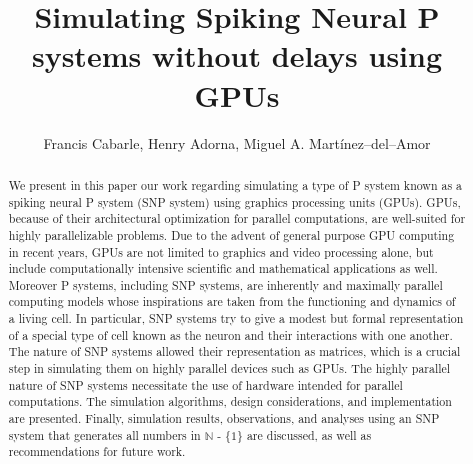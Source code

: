 \documentclass{svmultm}
\begin{document}
\title*{Simulating Spiking Neural P systems without delays using GPUs } \author{Francis Cabarle, Henry Adorna, Miguel A. Mart\'inez--del--Amor}
\date{}

\maketitle

 
\begin{abstract}


We present in this paper our work regarding simulating a type of P system known as a spiking neural P system (SNP system) using graphics processing units (GPUs). GPUs, because of their architectural optimization for parallel computations, are well-suited for highly parallelizable problems. Due to the advent of general purpose GPU computing in recent years, GPUs are not limited to graphics and video processing alone, but include computationally intensive scientific and mathematical applications as well. Moreover P systems, including SNP systems, are inherently and maximally parallel computing models whose inspirations are taken from the functioning and dynamics of a living cell. In particular, SNP systems try to give a modest but formal representation of a special type of cell known as the neuron and their interactions with one another. The nature of SNP systems allowed their representation as matrices, which is a crucial step in simulating them on highly parallel devices such as GPUs. The highly parallel nature of SNP systems necessitate the use of hardware intended for parallel computations. The simulation algorithms, design considerations, and implementation are presented. Finally, simulation results, observations, and analyses using an SNP system that generates all numbers in $\mathbb N$ - \{$1$\} are discussed, as well as recommendations for future work. 


\end{abstract}
\end{document}
